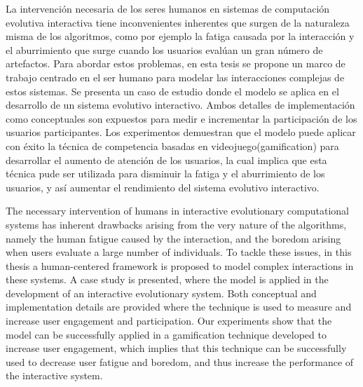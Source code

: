 


La intervenci\'on necesaria de los seres humanos en sistemas de computaci\'on
evolutiva interactiva tiene inconvenientes inherentes que surgen de la
naturaleza misma de los algoritmos, como por ejemplo la fatiga causada por la
interacci\'on y el aburrimiento que surge cuando los usuarios eval\'uan un gran
n\'umero de artefactos. Para abordar estos problemas, en esta tesis se propone
un marco de trabajo centrado en el ser humano para
modelar las interacciones complejas de estos sistemas. Se presenta un caso de
estudio donde el modelo se aplica en el desarrollo de un sistema evolutivo
interactivo. Ambos detalles de implementaci\'on como conceptuales
son expuestos para medir e incrementar la participaci\'on de los usuarios
participantes. Los experimentos demuestran que el modelo puede aplicar con
\'exito la t\'ecnica de competencia basadas en videojuego(gamification) para
desarrollar el aumento de atenci\'on de los usuarios, la cual implica que esta
t\'ecnica pude ser utilizada para disminuir la fatiga y el aburrimiento de los
usuarios, y as\'i aumentar el rendimiento del sistema evolutivo interactivo.





The necessary intervention of humans in interactive evolutionary computational
systems has inherent drawbacks arising from the very nature of the algorithms,
namely the human fatigue caused by the interaction, and the boredom arising
when users evaluate a large number of individuals. To tackle these issues, in this
thesis a human-centered framework is proposed to model complex interactions in
these  systems. A case study is presented, where the model is applied in the
development of an interactive evolutionary system. Both conceptual
and implementation details are provided where the technique is used to measure
and increase user engagement and participation. Our experiments show that the
model can be successfully applied in a gamification technique developed to
increase user engagement, which implies that this technique can be successfully
used to decrease user fatigue and boredom, and thus increase the performance of
the interactive system.
